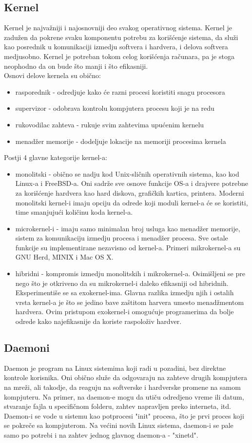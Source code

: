 \subsection{Kernel}
Kernel je najvažniji i najosnovniji deo svakog operativnog sistema. Kernel je zadužen da pokrene svaku komponentu potrebu za korišćenje sistema, da služi kao posrednik u komunikaciji izmedju softvera i hardvera, i delova softvera medjusobno. Kernel je potreban tokom celog korišćenja računara, pa je stoga neophodno da on bude što manji i što efikasniji.\\
Osnovi delove kernela su obično:
\begin{itemize}
\item rasporednik - odredjuje kako će razni procesi koristiti snagu procesora
\item supervizor - odobrava kontrolu kompjutera procesu koji je na redu
\item rukovodilac zahteva - rukuje svim zahtevima upućenim kernelu
\item menadžer memorije - dodeljuje lokacije na memoriji procesima kernela
\end{itemize}
Postji 4 glavne kategorije kernel-a:
\begin{itemize}
\item monolitski - obično se nadju kod Unix-sličnih operativnih sistema, kao kod Linux-a i FreeBSD-a. Oni sadrže sve osnove funkcije OS-a i drajvere potrebne za korišćenje hardvera kao hard diskova, grafičkih kartica, printera. Moderni monolitski kernel-i imaju opciju da odrede koji moduli kernel-a će se koristiti, time smanjujući količinu koda kernel-a.
\item microkernel-i - imaju samo minimalan broj usluga kao menadžer memorije, sistem za komunikaciju izmedju procesa i menadžer procesa. Sve ostale funkcije su implementirane nezavisno od kernel-a. Primeri mikrokernel-a su GNU Herd, MINIX i Mac OS X.
\item hibridni - kompromis izmedju monolitskih i mikrokernel-a. Osimišljeni se pre nego što je otkriveno da su mikrokernel-i daleko efikasniji od hibridnih.
Eksperimentiše se sa exokernel-ima. Glavna razlika izmedju njih i ostalih vrsta kernel-a je što se jedino bave zaštitom harvera umesto menadžmentom hardvera. Ovim pristupom exokernel-i omogućuje programerima da bolje odrede kako najefikasnije da koriste raspoloživ hardver.
\end{itemize}

\subsection{Daemoni}
Daemon je program na Linux sistemima koji radi u pozadini, bez direktne kontrole korisnika. Oni obično služe da odgovaraju na zahteve drugih kompjutera na mreži, ali takodje, da reaguju na softverske i hardverske promene na samom kompjuteru. Na primer, na daemon-e mogu da utiču odredjeno vreme ili datum, stvaranje fajla u specifičnom folderu, zahtev napravljen preko interneta, itd.
Daemon-i se vode u sistemu kao potprocesi "init" procesa, što je prvi proces koji se pokreče sa kompjuterom. Na većini novih Linux sistema, daemon-i se pale samo po potrebi i na zahtev jednog glavnog daemon-a - "xinetd".

